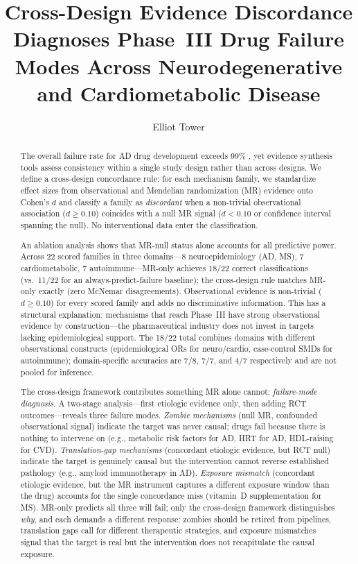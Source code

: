 \documentclass[11pt]{article}
\title{Cross-Design Evidence Discordance Diagnoses Phase~III Drug Failure Modes Across Neurodegenerative and Cardiometabolic Disease}
\author{Elliot Tower}
\affil{Independent researcher \\ \texttt{elliot@elliottower.ai}}
\date{}
\begin{document}
\maketitle

\begin{abstract}
The overall failure rate for AD drug development exceeds 99\% \citep{cummings2014}, yet evidence synthesis tools assess consistency within a single study design rather than across designs. We define a cross-design concordance rule: for each mechanism family, we standardize effect sizes from observational and Mendelian randomization (MR) evidence onto Cohen's $d$ and classify a family as \emph{discordant} when a non-trivial observational association ($d \geq 0.10$) coincides with a null MR signal ($d < 0.10$ or confidence interval spanning the null). No interventional data enter the classification.

An ablation analysis shows that MR-null status alone accounts for all predictive power. Across 22 scored families in three domains---8 neuroepidemiology (AD, MS), 7 cardiometabolic, 7 autoimmune---MR-only achieves 18/22 correct classifications (vs.\ 11/22 for an always-predict-failure baseline); the cross-design rule matches MR-only exactly (zero McNemar disagreements). Observational evidence is non-trivial ($d \geq 0.10$) for every scored family and adds no discriminative information. This has a structural explanation: mechanisms that reach Phase~III have strong observational evidence by construction---the pharmaceutical industry does not invest in targets lacking epidemiological support. The 18/22 total combines domains with different observational constructs (epidemiological ORs for neuro/cardio, case-control SMDs for autoimmune); domain-specific accuracies are 7/8, 7/7, and 4/7 respectively and are not pooled for inference.

The cross-design framework contributes something MR alone cannot: \emph{failure-mode diagnosis}. A two-stage analysis---first etiologic evidence only, then adding RCT outcomes---reveals three failure modes. \emph{Zombie mechanisms} (null MR, confounded observational signal) indicate the target was never causal; drugs fail because there is nothing to intervene on (e.g., metabolic risk factors for AD, HRT for AD, HDL-raising for CVD). \emph{Translation-gap mechanisms} (concordant etiologic evidence, but RCT null) indicate the target is genuinely causal but the intervention cannot reverse established pathology (e.g., amyloid immunotherapy in AD). \emph{Exposure mismatch} (concordant etiologic evidence, but the MR instrument captures a different exposure window than the drug) accounts for the single concordance miss (vitamin~D supplementation for MS). MR-only predicts all three will fail; only the cross-design framework distinguishes \emph{why}, and each demands a different response: zombies should be retired from pipelines, translation gaps call for different therapeutic strategies, and exposure mismatches signal that the target is real but the intervention does not recapitulate the causal exposure.


\end{abstract}
\end{document}
